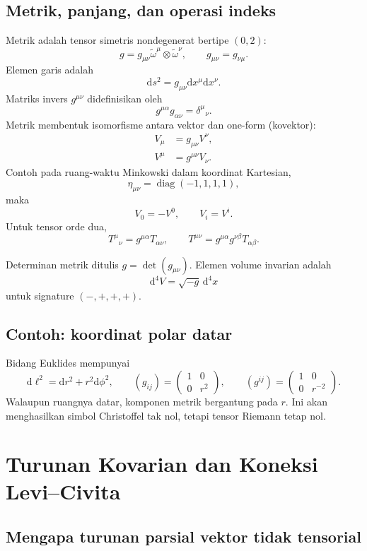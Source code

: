 \documentclass[12pt,a4paper]{report}
\newcommand{\dd}{\mathrm{d}}
\newcommand{\dual}{\widetilde{\omega}}
\begin{document}
\section{Metrik, panjang, dan operasi indeks}

Metrik adalah tensor simetris nondegenerat bertipe $(0,2)$:
\[
 g=g_{\mu\nu}\dual^\mu\otimes\dual^\nu,
 \qquad g_{\mu\nu}=g_{\nu\mu}.
\]
Elemen garis adalah
\[
 \dd s^2=g_{\mu\nu}\dd x^\mu\dd x^\nu.
\]
Matriks invers $g^{\mu\nu}$ didefinisikan oleh
\[
 g^{\mu\alpha}g_{\alpha\nu}=\delta^\mu{}_\nu.
\]
Metrik membentuk isomorfisme antara vektor dan one-form (kovektor):
\begin{align}
 V_\mu&=g_{\mu\nu}V^\nu,\\
 V^\mu&=g^{\mu\nu}V_\nu.
\end{align}
Contoh pada ruang-waktu Minkowski dalam koordinat Kartesian,
\[
 \eta_{\mu\nu}=\operatorname{diag}(-1,1,1,1),
 \]
maka
\[
 V_0=-V^0,\qquad V_i=V^i.
\]
Untuk tensor orde dua,
\[
 T^\mu{}_\nu=g^{\mu\alpha}T_{\alpha\nu},
 \qquad
 T^{\mu\nu}=g^{\mu\alpha}g^{\nu\beta}T_{\alpha\beta}.
\]

Determinan metrik ditulis $g=\det(g_{\mu\nu})$. Elemen volume invarian adalah
\[
 \dd^4V=\sqrt{-g}\,\dd^4x
\]
untuk signature $(-,+,+,+)$.

\section{Contoh: koordinat polar datar}

Bidang Euklides mempunyai
\[
 \dd \ell^2=\dd r^2+r^2\dd\phi^2,
 \qquad
 (g_{ij})=\begin{pmatrix}1&0\\0&r^2\end{pmatrix},
 \qquad
 (g^{ij})=\begin{pmatrix}1&0\\0&r^{-2}\end{pmatrix}.
\]
Walaupun ruangnya datar, komponen metrik bergantung pada $r$. Ini akan menghasilkan
simbol Christoffel tak nol, tetapi tensor Riemann tetap nol.

\chapter{Turunan Kovarian dan Koneksi Levi--Civita}

\section{Mengapa turunan parsial vektor tidak tensorial}
\end{document}
